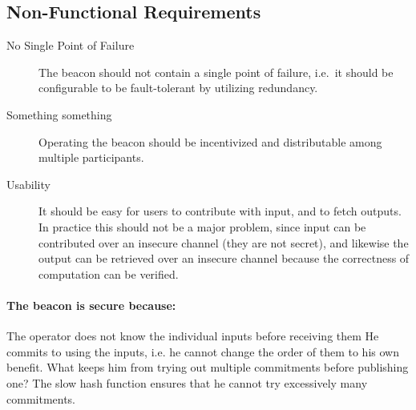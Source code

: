 \subsection{Non-Functional Requirements}
\label{sub:non_functional_requirements}

\begin{description}
    \item[No Single Point of Failure] The beacon should not contain a single point of failure, i.e.\ it should be configurable to be fault-tolerant by utilizing redundancy.
    \item[Something something] Operating the beacon should be incentivized and distributable among multiple participants.   
    \item[Usability] It should be easy for users to contribute with input, and to fetch outputs. In practice this should not be a major problem, since input can be contributed over an insecure channel (they are not secret), and likewise the output can be retrieved over an insecure channel because the correctness of computation can be verified. 
\end{description}


\paragraph{The beacon is secure because:}
The operator does not know the individual inputs before receiving them
He commits to using the inputs, i.e. he cannot change the order of them to his own benefit. What keeps him from trying out multiple commitments before publishing one?
The slow hash function ensures that he cannot try excessively many commitments.

